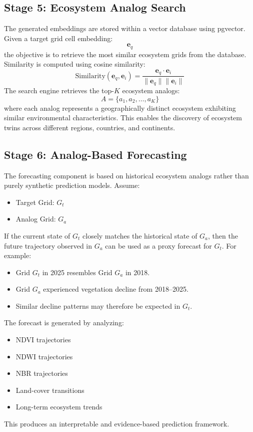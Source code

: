 \documentclass[11pt,a4paper]{article}
\begin{document}
\subsection{Stage 5: Ecosystem Analog Search}
The generated embeddings are stored within a vector database using pgvector. Given a target grid cell embedding:
\[
\mathbf{e}_q
\]
the objective is to retrieve the most similar ecosystem grids from the database. Similarity is computed using cosine similarity:
\[
\text{Similarity}(\mathbf{e}_q, \mathbf{e}_i) = \frac{\mathbf{e}_q \cdot \mathbf{e}_i}{\|\mathbf{e}_q\| \|\mathbf{e}_i\|}
\]
The search engine retrieves the top-$K$ ecosystem analogs:
\[
A = \{a_1, a_2, \ldots, a_K\}
\]
where each analog represents a geographically distinct ecosystem exhibiting similar environmental characteristics. This enables the discovery of ecosystem twins across different regions, countries, and continents.

\subsection{Stage 6: Analog-Based Forecasting}
The forecasting component is based on historical ecosystem analogs rather than purely synthetic prediction models. Assume:
\begin{itemize}
\item Target Grid: $G_t$
\item Analog Grid: $G_a$
\end{itemize}
If the current state of $G_t$ closely matches the historical state of $G_a$, then the future trajectory observed in $G_a$ can be used as a proxy forecast for $G_t$. For example:
\begin{itemize}
\item Grid $G_t$ in 2025 resembles Grid $G_a$ in 2018.
\item Grid $G_a$ experienced vegetation decline from 2018--2025.
\item Similar decline patterns may therefore be expected in $G_t$.
\end{itemize}
The forecast is generated by analyzing:
\begin{itemize}
\item NDVI trajectories
\item NDWI trajectories
\item NBR trajectories
\item Land-cover transitions
\item Long-term ecosystem trends
\end{itemize}
This produces an interpretable and evidence-based prediction framework.
\end{document}
